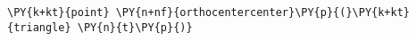 \begin{Verbatim}[commandchars=\\\{\}]
    \PY{k+kt}{point} \PY{n+nf}{orthocentercenter}\PY{p}{(}\PY{k+kt}{triangle} \PY{n}{t}\PY{p}{)}
\end{Verbatim}
